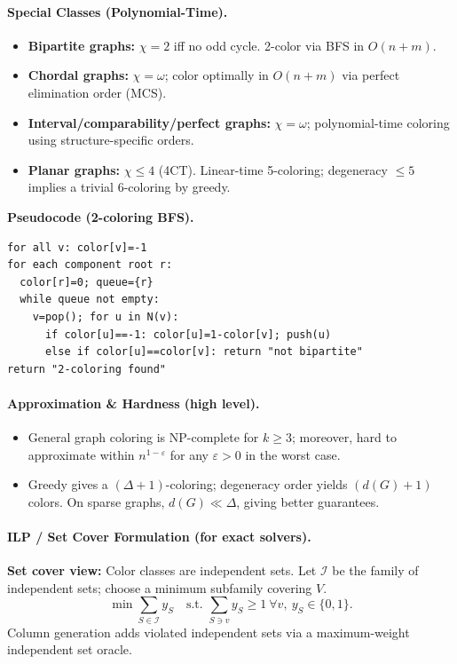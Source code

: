 \documentclass[9pt]{extarticle}
\begin{document}
\paragraph{Special Classes (Polynomial-Time).}
\begin{itemize}
  \item \textbf{Bipartite graphs:} $\chi=2$ iff no odd cycle. 2-color via BFS in $O(n+m)$.
  \item \textbf{Chordal graphs:} $\chi=\omega$; color optimally in $O(n+m)$ via perfect elimination order (MCS).
  \item \textbf{Interval/comparability/perfect graphs:} $\chi=\omega$; polynomial-time coloring using structure-specific orders.
  \item \textbf{Planar graphs:} $\chi\le 4$ (4CT). Linear-time 5-coloring; degeneracy $\le 5$ implies a trivial 6-coloring by greedy.
\end{itemize}
\textbf{Pseudocode (2-coloring BFS).}
\begin{verbatim}
for all v: color[v]=-1
for each component root r:
  color[r]=0; queue={r}
  while queue not empty:
    v=pop(); for u in N(v):
      if color[u]==-1: color[u]=1-color[v]; push(u)
      else if color[u]==color[v]: return "not bipartite"
return "2-coloring found"
\end{verbatim}

\paragraph{Approximation \& Hardness (high level).}
\begin{itemize}
  \item General graph coloring is NP-complete for $k\ge 3$; moreover, hard to approximate within $n^{1-\varepsilon}$ for any $\varepsilon>0$ in the worst case.
  \item Greedy gives a $(\Delta+1)$-coloring; degeneracy order yields $(d(G)+1)$ colors. On sparse graphs, $d(G)\ll \Delta$, giving better guarantees.
\end{itemize}

\paragraph{ILP / Set Cover Formulation (for exact solvers).}
\textbf{Set cover view:} Color classes are independent sets. Let $\mathcal{I}$ be the family of independent sets; choose a minimum subfamily covering $V$.
\[
\min \sum_{S\in \mathcal{I}} y_S \quad
\text{s.t. } \sum_{S\ni v} y_S \ge 1 \ \forall v,\ y_S\in\{0,1\}.
\]
Column generation adds violated independent sets via a maximum-weight independent set oracle.
\end{document}
